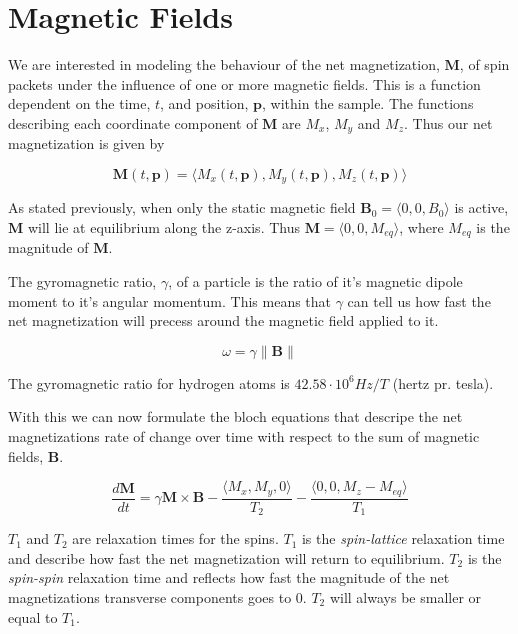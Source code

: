 \section{Magnetic Fields}


We are interested in modeling the behaviour of the net magnetization,
$\textbf{M}$, of spin packets under the influence of one or more
magnetic fields. This is a function dependent on the time, $t$, and
position, $\textbf{p}$, within the sample. The functions describing
each coordinate component of $\textbf{M}$ are $M_x$, $M_y$ and
$M_z$. Thus our net magnetization is given by

\begin{displaymath}
  \textbf{M}(t, \textbf{p}) = \langle M_x(t, \textbf{p}), M_y(t, \textbf{p}), M_z(t, \textbf{p}) \rangle
\end{displaymath}

As stated previously, when only the static magnetic field
$\mathbf{B}_0 = \langle 0, 0, B_0 \rangle$ is active, $\textbf{M}$
will lie at equilibrium along the z-axis. Thus $\textbf{M} = \langle
0, 0, M_{eq} \rangle$, where $M_{eq}$ is the magnitude of $\textbf{M}$.

The gyromagnetic ratio, $\gamma$, of a particle is the ratio of it's
magnetic dipole moment to it's angular momentum. This means that
$\gamma$ can tell us how fast the net magnetization will precess
around the magnetic field applied to it. 

\begin{displaymath}
  \omega = \gamma \| \mathbf{B} \|
\end{displaymath}

The gyromagnetic ratio for hydrogen atoms is $42.58 \cdot 10^6 Hz / T$
(hertz pr. tesla).

With this we can now formulate the bloch equations that descripe the
net magnetizations rate of change over time with respect to the sum of
magnetic fields, $\mathbf{B}$.

\begin{displaymath}
  \frac{d\mathbf{M}}{dt} = \gamma \mathbf{M} \times \mathbf{B} -
  \frac{\langle M_x, M_y, 0 \rangle}{T_2} - \frac{\langle 0, 0, M_z -
    M_{eq} \rangle}{T_1}
\end{displaymath}

$T_1$ and $T_2$ are relaxation times for the spins. $T_1$ is the
\textit{spin-lattice} relaxation time and describe how fast the net
magnetization will return to equilibrium. $T_2$ is the
\textit{spin-spin} relaxation time and reflects how fast the magnitude
of the net magnetizations transverse components goes to 0. $T_2$ will
always be smaller or equal to $T_1$.

